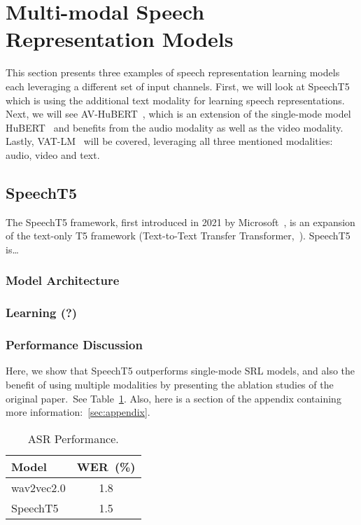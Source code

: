 \documentclass[11pt]{article}
\begin{document}
\section{Multi-modal Speech Representation Models}

This section presents three examples of speech representation learning models each leveraging a different set of input channels. First, we will look at SpeechT5~\cite{speecht5} which is using the additional text modality for learning speech representations. Next, we will see AV-HuBERT~\cite{AV_HuBERT}, which is an extension of the single-mode model HuBERT~\cite{} and benefits from the audio modality as well as the video modality. Lastly, VAT-LM~\cite{} will be covered, leveraging all three mentioned modalities: audio, video and text.

\subsection{SpeechT5}

The SpeechT5 framework, first introduced in 2021 by Microsoft~\cite{speecht5}, is an expansion of the text-only T5 framework (Text-to-Text Transfer Transformer,~). SpeechT5 is\dots

\subsubsection{Model Architecture}
\subsubsection{Learning (?)}
\subsubsection{Performance Discussion}

Here, we show that SpeechT5 outperforms single-mode SRL models, and also the benefit of using multiple modalities by presenting the ablation studies of the original paper.~See Table~\ref{table:speecht5_performance}. Also, here is a section of the appendix containing more information:~\ref{sec:appendix}.

\begin{table}
    \centering
    \begin{tabular}{lc}
    \hline
    \textbf{Model} & \textbf{WER~(\%)}\\
    \hline
    wav2vec2.0 & 1.8\\
    SpeechT5 & 1.5\\
    \hline
    \end{tabular}
    \caption{\label{table:speecht5_performance}ASR Performance.}
\end{table}
\end{document}
